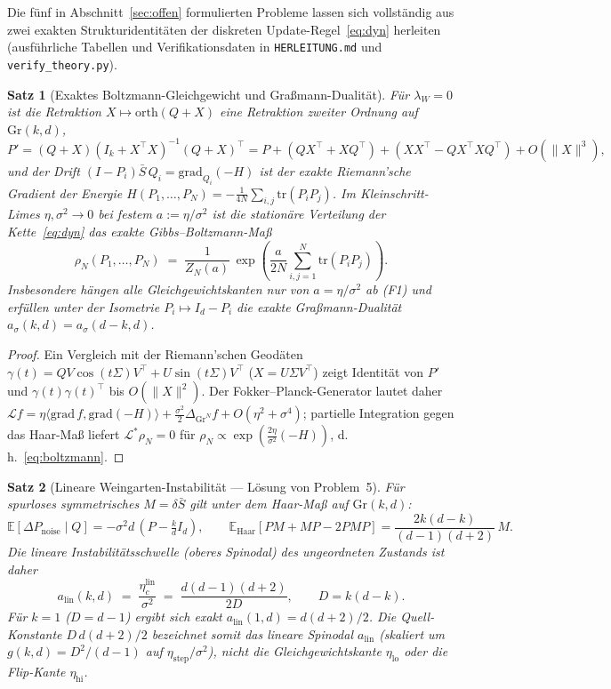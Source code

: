 \documentclass[11pt,a4paper]{article}
\newtheorem{satz}{Satz}
\theoremstyle{remark}
\newcommand{\Gr}{\mathrm{Gr}}
\newcommand{\E}{\mathbb{E}}
\begin{document}
Die fünf in Abschnitt~\ref{sec:offen} formulierten Probleme lassen sich
vollständig aus zwei exakten Strukturidentitäten der diskreten
Update-Regel~\eqref{eq:dyn} herleiten (ausführliche Tabellen und
Verifikationsdaten in \texttt{HERLEITUNG.md} und \texttt{verify\_theory.py}).

\begin{satz}[Exaktes Boltzmann-Gleichgewicht und Graßmann-Dualität]\label{thm:boltzmann}
Für $\lambda_W=0$ ist die Retraktion $X\mapsto\mathrm{orth}(Q+X)$ eine
Retraktion zweiter Ordnung auf $\Gr(k,d)$,
\[
P'=(Q+X)(I_k+X^\top X)^{-1}(Q+X)^\top
= P + (QX^\top+XQ^\top) + (XX^\top - QX^\top X Q^\top) + O(\|X\|^3),
\]
und der Drift $(I-P_i)\bar S\,Q_i=\mathrm{grad}_{Q_i}(-H)$ ist der exakte
Riemann'sche Gradient der Energie $H(P_1,\dots,P_N)=-\frac{1}{4N}\sum_{i,j}\mathrm{tr}(P_i P_j)$.
Im Kleinschritt-Limes $\eta,\sigma^2\to0$ bei festem $a:=\eta/\sigma^2$ ist die
stationäre Verteilung der Kette~\eqref{eq:dyn} das exakte Gibbs--Boltzmann-Maß
\begin{equation}\label{eq:boltzmann}
\rho_N(P_1,\dots,P_N)\;=\;\frac{1}{Z_N(a)}\,\exp\!\left(\frac{a}{2N}\sum_{i,j=1}^N \mathrm{tr}(P_i P_j)\right).
\end{equation}
Insbesondere hängen alle Gleichgewichtskanten nur von $a=\eta/\sigma^2$ ab
(F1) und erfüllen unter der Isometrie $P_i\mapsto I_d-P_i$ die exakte
Graßmann-Dualität $a_\sigma(k,d)=a_\sigma(d-k,d)$.
\end{satz}
\begin{proof}
Ein Vergleich mit der Riemann'schen Geodäten $\gamma(t)=QV\cos(t\Sigma)V^\top+U\sin(t\Sigma)V^\top$
($X=U\Sigma V^\top$) zeigt Identität von $P'$ und $\gamma(t)\gamma(t)^\top$ bis
$O(\|X\|^2)$. Der Fokker--Planck-Generator lautet daher
$\mathcal L f = \eta\langle\mathrm{grad}\,f,\mathrm{grad}(-H)\rangle+\frac{\sigma^2}{2}\Delta_{\Gr^N}f+O(\eta^2+\sigma^4)$;
partielle Integration gegen das Haar-Maß liefert $\mathcal L^\ast\rho_N=0$ für
$\rho_N\propto\exp(\frac{2\eta}{\sigma^2}(-H))$, d.\,h.\ \eqref{eq:boltzmann}.
\end{proof}

\begin{satz}[Lineare Weingarten-Instabilität --- Lösung von Problem~5]\label{thm:weingarten}
Für spurloses symmetrisches $M=\delta\bar S$ gilt unter dem Haar-Maß auf $\Gr(k,d)$:
\[
\E[\Delta P_{\mathrm{noise}}\mid Q]=-\sigma^2 d\,(P-\tfrac{k}{d}I_d),
\qquad
\E_{\mathrm{Haar}}[PM+MP-2PMP]=\frac{2k(d-k)}{(d-1)(d+2)}\,M.
\]
Die lineare Instabilitätsschwelle (oberes Spinodal) des ungeordneten Zustands ist daher
\begin{equation}\label{eq:alin}
a_{\mathrm{lin}}(k,d)\;=\;\frac{\eta_c^{\mathrm{lin}}}{\sigma^2}\;=\;\frac{d(d-1)(d+2)}{2D},
\qquad D=k(d-k).
\end{equation}
Für $k=1$ ($D=d-1$) ergibt sich exakt $a_{\mathrm{lin}}(1,d)=d(d+2)/2$.
Die Quell-Konstante $D\,d(d+2)/2$ bezeichnet somit das lineare Spinodal
$a_{\mathrm{lin}}$ (skaliert um $g(k,d)=D^2/(d-1)$ auf $\eta_{\mathrm{step}}/\sigma^2$),
nicht die Gleichgewichtskante $\eta_{\mathrm{lo}}$ oder die Flip-Kante $\eta_{\mathrm{hi}}$.
\end{satz}
\end{document}
